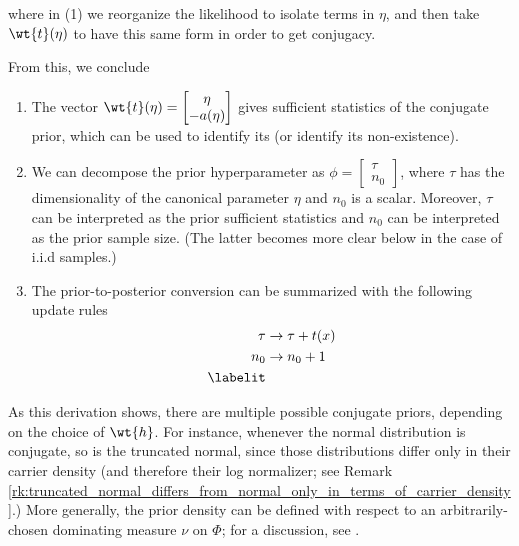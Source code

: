 where in (1) we reorganize the likelihood to isolate terms in $\eta$, and then take $\wt{\sufficientStatsFunction}(\eta)$ to have this same form in order to get conjugacy.  

From this, we conclude
\begin{enumerate} 
\item The vector $\wt{\sufficientStatsFunction}(\eta) = \begin{bmatrix} 
\eta \\
-\logNormalizerFunction(\eta)
\end{bmatrix}$ gives sufficient statistics of the conjugate prior, which can be used to identify its (or identify its non-existence).
\item We can decompose the prior hyperparameter as $\phi = \begin{bmatrix} 
\tau \\
n_0
\end{bmatrix}$,   
where $\tau$ has the dimensionality of the canonical parameter $\eta$ and $n_0$ is a scalar.  Moreover, $\tau$ can be interpreted as the prior sufficient statistics and $n_0$ can be interpreted as the prior sample size.  (The latter becomes more clear below in the case of i.i.d samples.)	
\item  The prior-to-posterior conversion can be summarized with the following update rules
\begin{align*}
\tau & \to \tau + \sufficientStatsFunction(x) \\
n_0 & \to  n_0 + 1 \\
\labelit \label{eqn:general_formalism_prior_to_posterior_conversion_after_single_observation}
\end{align*}
\end{enumerate}

\begin{remark}
As this derivation shows, there are multiple possible conjugate priors, depending on the choice of $\wt{h}$.   For instance, whenever the normal distribution is conjugate, so is the truncated normal, since those distributions differ only in their carrier density (and therefore their log normalizer; see Remark \ref{rk:truncated_normal_differs_from_normal_only_in_terms_of_carrier_density}.)  More generally, the prior density can be defined with respect to an arbitrarily-chosen dominating measure $\nu$ on $\Phi$; for a discussion, see  \href{https://stats.stackexchange.com/questions/176668/can-anyone-explain-conjugate-priors-in-simplest-possible-terms}{}.
\label{rk:conjugate_prior_can_have_any_desired_carrier_density}
\end{remark}


